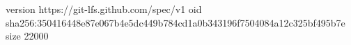 version https://git-lfs.github.com/spec/v1
oid sha256:350416448e87e067b4e5dc449b784cd1a0b343196f7504084a12c325bf495b7e
size 22000
